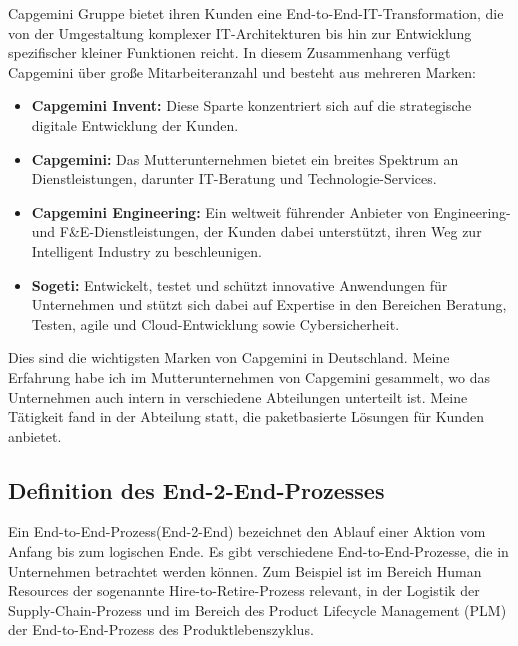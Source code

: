 \documentclass[a4paper, 12pt]{scrartcl}
\begin{document}
	Capgemini Gruppe bietet ihren Kunden eine End-to-End-IT-Transformation, die von der Umgestaltung komplexer IT-Architekturen bis hin zur Entwicklung spezifischer kleiner Funktionen reicht. In diesem Zusammenhang verfügt Capgemini über große Mitarbeiteranzahl und besteht aus mehreren Marken:
	\begin{itemize}
		\item \textbf{Capgemini Invent\cite{Capgemini_invent}:} Diese Sparte konzentriert sich auf die strategische digitale Entwicklung der Kunden.
		\item \textbf{Capgemini\cite{Capgemini}:} Das Mutterunternehmen bietet ein breites Spektrum an Dienstleistungen, darunter IT-Beratung und Technologie-Services.
		\item \textbf{Capgemini Engineering\cite{Capgemini_eng}:} Ein weltweit führender Anbieter von Engineering- und F\&E-Dienstleistungen, der Kunden dabei unterstützt, ihren Weg zur Intelligent Industry zu beschleunigen.
		\item \textbf{Sogeti\cite{Sogeti}:} Entwickelt, testet und schützt innovative Anwendungen für Unternehmen und stützt sich dabei auf Expertise in den Bereichen Beratung, Testen, agile und Cloud-Entwicklung sowie Cybersicherheit.
	\end{itemize}
	Dies sind die wichtigsten Marken von Capgemini in Deutschland. Meine Erfahrung habe ich im Mutterunternehmen von Capgemini gesammelt, wo das Unternehmen auch intern in verschiedene Abteilungen unterteilt ist. Meine Tätigkeit fand in der Abteilung statt, die paketbasierte Lösungen %
	für Kunden anbietet.
	
	
	\subsection{Definition des End-2-End-Prozesses}
	Ein End-to-End-Prozess(End-2-End) bezeichnet den Ablauf einer Aktion vom Anfang bis zum logischen Ende. Es gibt verschiedene End-to-End-Prozesse, die in Unternehmen betrachtet werden können. Zum Beispiel ist im Bereich Human Resources der sogenannte Hire-to-Retire-Prozess relevant, in der Logistik der Supply-Chain-Prozess und im Bereich des Product Lifecycle Management (PLM) der End-to-End-Prozess des Produktlebenszyklus.
\end{document}
